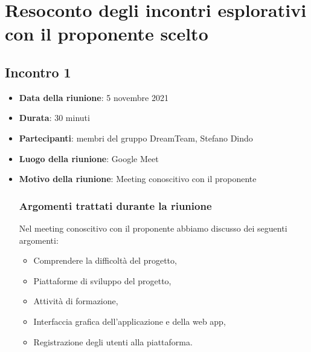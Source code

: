 \section{Resoconto degli incontri esplorativi con il proponente scelto}
\subsection{Incontro 1}
\begin{itemize}
\item \textbf{Data della riunione}: 5 novembre 2021
\item \textbf{Durata}: 30 minuti
\item \textbf{Partecipanti}: membri del gruppo DreamTeam,  Stefano Dindo
\item \textbf{Luogo della riunione}: Google Meet
\item \textbf{Motivo della riunione}: Meeting conoscitivo con il proponente
\subsubsection{Argomenti trattati durante la riunione}
Nel meeting conoscitivo con il proponente abbiamo discusso dei seguenti argomenti:
	\begin{itemize}
		\item Comprendere la difficoltà del progetto,
		\item Piattaforme di sviluppo del progetto,
		\item Attività di formazione,
		\item Interfaccia grafica dell’applicazione e della web app,
		\item Registrazione degli utenti alla piattaforma.
	\end{itemize}
\end{itemize} 

